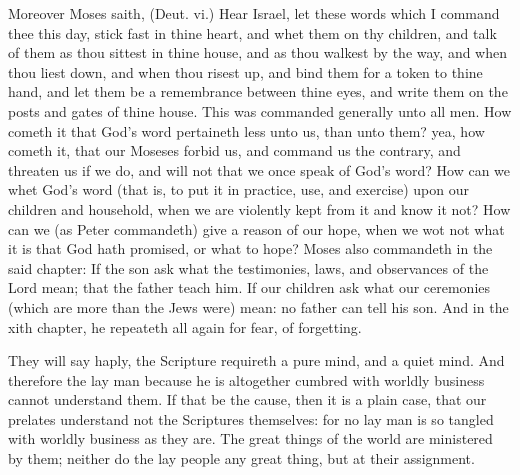 Moreover Moses saith, (Deut. vi.) Hear Israel,
let these words which I command thee this day,
stick fast in thine heart, and whet them on thy
children, and talk of them as thou sittest in thine
house, and as thou walkest by the way, and when
thou liest down, and when thou risest up, and
bind them for a token to thine hand, and let 
them be a remembrance between thine eyes, 
and write them on the posts and gates of thine 
house. This was commanded generally unto all 
men. How cometh it that God's word pertaineth
less unto us, than unto them? yea, how cometh 
it, that our Moseses forbid us, and command us 
the contrary, and threaten us if we do, and will 
not that we once speak of God's word? How 
can we whet God's word (that is, to put it in
practice, use, and exercise) upon our children 
and household, when we are violently kept from 
it and know it not? How can we (as Peter commandeth)
give a reason of our hope, when we 
wot not what it is that God hath promised, or 
what to hope? Moses also commandeth in the 
said chapter: If the son ask what the testimonies,
laws, and observances of the Lord mean; that 
the father teach him. If our children ask what 
our ceremonies (which are more than the Jews 
were) mean: no father can tell his son. And in 
the xith chapter, he repeateth all again for fear,
of forgetting.

They will say haply, the Scripture requireth a 
pure mind, and a quiet mind. And therefore 
the lay man because he is altogether cumbred 
with worldly business cannot understand them. 
If that be the cause, then it is a plain case, that 
our prelates understand not the Scriptures themselves:
for no lay man is so tangled with worldly 
business as they are. The great things of the 
world are ministered by them; neither do the 
lay people any great thing, but at their assignment.

